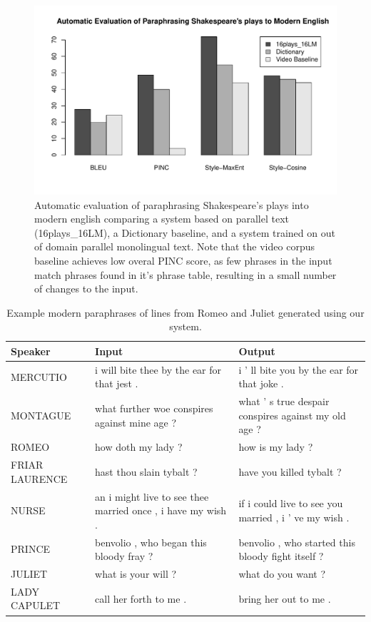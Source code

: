 \documentclass[10pt,a5paper,twoside]{article}
\begin{document}
\begin{figure}
  \includegraphics[width=5in]{figures/shakespeare_to_modern.pdf}
  \caption{Automatic evaluation of paraphrasing Shakespeare's plays into modern english comparing a system based on parallel text (16plays\_16LM), 
  a Dictionary baseline, and a system trained on out of domain parallel monolingual text.  Note that the video corpus baseline achieves low overal
  PINC score, as few phrases in the input match phrases found in it's phrase table, resulting in a small number of changes to the input.}
  \label{shakespeare_to_modern_automatic}
\end{figure}

\begin{table}
  \begin{center}
  \begin{tabular}{|l|p{1.8in}|p{1.8in}|}
    \hline
    Speaker & Input & Output \\
    \hline
    \hline
    MERCUTIO & i will bite thee by the ear for that jest . & i ’ ll bite you by the ear for that joke . \\
    \hline
    MONTAGUE & what further woe conspires against mine age ? & what ’ s true despair conspires against my old age ? \\
    \hline
    ROMEO & how doth my lady ? & how is my lady ? \\
    \hline
    FRIAR LAURENCE & hast thou slain tybalt ? & have you killed tybalt ? \\
    \hline
    NURSE & an i might live to see thee married once , i have my wish . & if i could live to see you married , i ’ ve my wish . \\
    \hline
    PRINCE & benvolio , who began this bloody fray ? & benvolio , who started this bloody fight itself ? \\
    \hline
    JULIET & what is your will ? & what do you want ? \\
    \hline
    LADY CAPULET & call her forth to me . & bring her out to me . \\
    \hline
  \end{tabular}
  \end{center}
  \caption{Example modern paraphrases of lines from Romeo and Juliet generated using our system.}
  \label{modern_examples}
\end{table}
\end{document}
